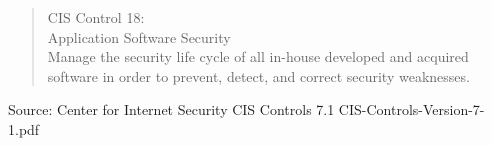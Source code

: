 \documentclass[Screen16to9,17pt]{foils}
\begin{document}

\begin{quote}
CIS Control 18:\\
Application Software Security\\
Manage the security life cycle of all in-house developed and acquired software in order to prevent, detect, and correct security weaknesses.
\end{quote}

\begin{list1}
\item
\item
\item
\item
\end{list1}

Source: Center for Internet Security CIS Controls 7.1 CIS-Controls-Version-7-1.pdf


\slidenext{}
\end{document}
